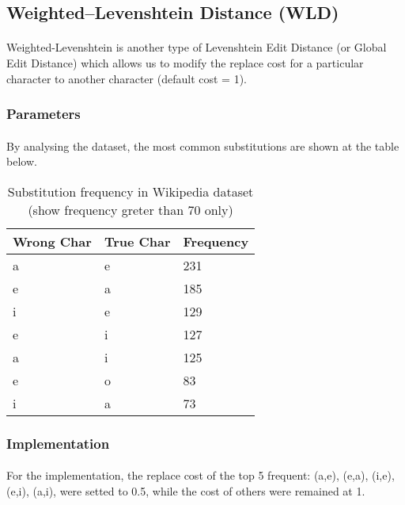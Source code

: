 \documentclass[11pt]{article}
\begin{document}
\subsection{Weighted–Levenshtein Distance (WLD)}

\paragraph{} Weighted-Levenshtein is another type of Levenshtein Edit Distance (or Global Edit Distance) which allows us to modify the replace cost for a particular character to another character (default cost = 1).

\subsubsection{Parameters}

\paragraph{} By analysing the dataset, the most common substitutions are shown at the table below.

\begin{table}[h]
 \begin{center}
\begin{tabular}{| l | l | l |}

      \hline
      Wrong Char & True Char & Frequency \\
      \hline\hline
	 a & e & 231 \\     
	 e & a & 185 \\
      i & e & 129 \\
      e & i & 127 \\
      a & i & 125 \\
      e & o & 83 \\
      i & a & 73 \\
      \hline

\end{tabular}
\caption{Substitution frequency in Wikipedia dataset (show frequency greter than 70 only)}\label{table4}
 \end{center}
\end{table}

\subsubsection{Implementation}

\paragraph{} For the implementation, the replace cost of the top 5 frequent: (a,e), (e,a), (i,e), (e,i), (a,i), were setted to 0.5, while the cost of others were remained at 1.
\end{document}
